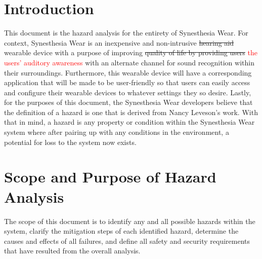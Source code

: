 \documentclass[12pt, titlepage]{article}
\begin{document}
\section{Introduction}
This document is the hazard analysis for the entirety of Synesthesia Wear.
For context, Synesthesia Wear is an inexpensive and non-intrusive \sout{hearing aid} 
wearable device with a purpose of improving \sout{quality of life by providing users} \textcolor{red}{the users' auditory awareness} with 
an alternate channel for sound recognition within their surroundings. Furthermore, 
this wearable device will have a corresponding application that will be made to be 
user-friendly so that users can easily access and configure their wearable devices to 
whatever settings they so desire. Lastly, for the purposes of this document, the 
Synesthesia Wear developers believe that the definition of a hazard is one that is 
derived from Nancy Leveson's work. With that in mind, a hazard is any property or 
condition within the Synesthesia Wear system where after pairing up with any 
conditions in the environment, a potential for loss to the system now exists.

\section{Scope and Purpose of Hazard Analysis}
The scope of this document is to identify any and all possible hazards within 
the system, clarify the mitigation steps of each identified hazard, determine 
the causes and effects of all failures, and define all safety and security requirements 
that have resulted from the overall analysis.
\end{document}
